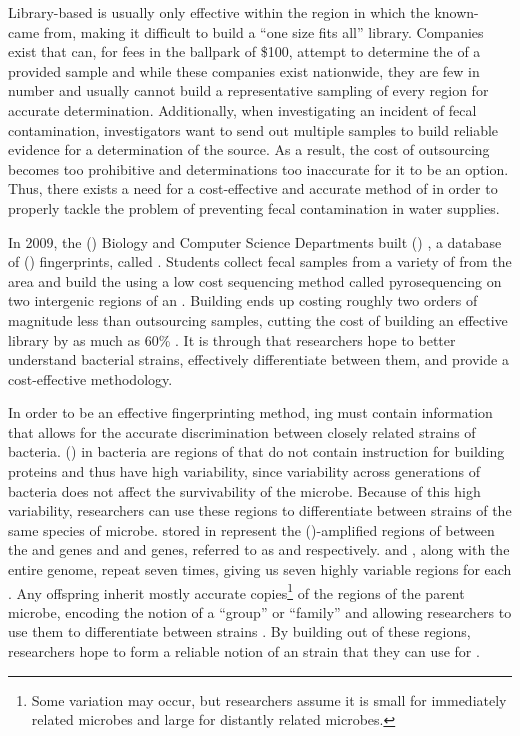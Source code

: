 Library-based \mst{} is usually only effective within the region in which the known-\spec{} \isols{} came from, making it difficult to build a ``one size fits all'' library.
Companies exist that can, for fees in the ballpark of \$100, attempt to determine the \spec{} of a provided sample
and while these companies exist nationwide, they are few in number and usually cannot build a representative sampling of every region for accurate \spec{} determination.
Additionally, when investigating an incident of fecal contamination, investigators want to send out multiple samples to build reliable evidence for a determination of the source.
As a result, the cost of outsourcing becomes too prohibitive and determinations too inaccurate for it to be an option.
Thus, there exists a need for a cost-effective and accurate method of \mst{} in order to properly tackle the problem of preventing fecal contamination in water supplies.

In 2009, the \cplong{} (\cp{}) Biology and Computer Science Departments built \cploplong{} (\cplop{}) \cite{soliman2013cplop}, a database of \ecolilong{} (\ecoli{}) \isol{} fingerprints, called \pyros{}.
Students collect fecal samples from a variety of \spec{} from the \slo{} area and build the \pyros{} using a low cost \dna{} sequencing method called pyrosequencing on two intergenic regions of an \ecoli{} \isol{}.
Building \pyros{} ends up costing roughly two orders of magnitude less than outsourcing samples, cutting the cost of building an effective \mst{} library by as much as 60\% \cite{Black2014121}.
It is through \cplop{} that \cp{} researchers hope to better understand bacterial strains, effectively differentiate between them, and provide a cost-effective \mst{} methodology.

In order to be an effective \mst{} fingerprinting method, \pyro{}ing must contain information that allows for the accurate discrimination between closely related strains of \ecoli{} bacteria.
\ITSlongs{} (\itsshort{}) in bacteria are regions of \dna{} that do not contain instruction for building proteins and thus have high variability, since variability across generations of bacteria does not affect the survivability of the microbe.
Because of this high variability, researchers can use these regions to differentiate between strains of the same species of microbe.
\ecoli{} \isol{} \pyros{} stored in \cplop{} represent the \pcrlong{} (\pcr{})-amplified regions of \dna{} between the \Gsixt{} and \Gtwen{} genes and \Gtwen{} and \Gfive{} genes, referred to as \Ssixt{} and \Sfive{} respectively.
\Ssixt{} and \Sfive{}, along with the entire \ecoli{} genome, repeat seven times, giving us seven highly variable regions for each \itsshort{}.
Any offspring inherit mostly accurate copies\footnote{Some variation may occur, but researchers assume it is small for immediately related microbes and large for distantly related microbes.} of the \itsshort{} regions of the parent microbe, encoding the notion of a ``group'' or ``family'' and allowing researchers to use them to differentiate between strains \cite{SolimanDVMBNWKG12}.
By building \pyros{} out of these regions, \cplop{} researchers hope to form a reliable notion of an \ecoli{} strain that they can use for \mst{}.

